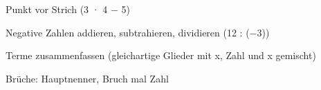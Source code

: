 \setcounter{aufgabe}{0}

\begin{aufgabe}{Punkt vor Strich (3 · 4 − 5)}
\end{aufgabe}

\begin{aufgabe}{Negative Zahlen addieren, subtrahieren, dividieren (12 : (−3))}
\end{aufgabe}

\begin{aufgabe}{Terme zusammenfassen (gleichartige Glieder mit x, Zahl und x gemischt)}
\end{aufgabe}

\begin{aufgabe}{Brüche: Hauptnenner, Bruch mal Zahl}
\end{aufgabe}

